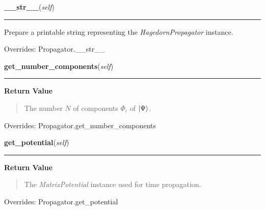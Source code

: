     \vspace{0.5ex}

\hspace{.8\funcindent}\begin{boxedminipage}{\funcwidth}

    \raggedright \textbf{\_\_str\_\_}(\textit{self})

    \vspace{-1.5ex}

    \rule{\textwidth}{0.5\fboxrule}
\setlength{\parskip}{2ex}
    Prepare a printable string representing the \textit{HagedornPropagator}
    instance.

\setlength{\parskip}{1ex}

      Overrides: Propagator.\_\_str\_\_

    \end{boxedminipage}

    \vspace{0.5ex}

\hspace{.8\funcindent}\begin{boxedminipage}{\funcwidth}

    \raggedright \textbf{get\_number\_components}(\textit{self})

    \vspace{-1.5ex}

    \rule{\textwidth}{0.5\fboxrule}
\setlength{\parskip}{2ex}
\setlength{\parskip}{1ex}
      \textbf{Return Value}
    \vspace{-1ex}

      \begin{quote}
      The number $N$ of components $\Phi_i$ of
      $\Ket{\Psi}$.

      \end{quote}

      Overrides: Propagator.get\_number\_components

    \end{boxedminipage}

    \vspace{0.5ex}

\hspace{.8\funcindent}\begin{boxedminipage}{\funcwidth}

    \raggedright \textbf{get\_potential}(\textit{self})

    \vspace{-1.5ex}

    \rule{\textwidth}{0.5\fboxrule}
\setlength{\parskip}{2ex}
\setlength{\parskip}{1ex}
      \textbf{Return Value}
    \vspace{-1ex}

      \begin{quote}
      The \textit{MatrixPotential} instance used for time propagation.

      \end{quote}

      Overrides: Propagator.get\_potential

    \end{boxedminipage}

